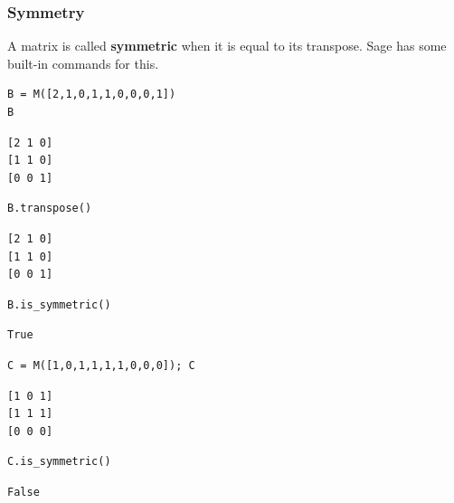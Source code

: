 \documentclass[10pt,]{book}
\newcommand{\terminology}[1]{\textbf{#1}}
\theoremstyle{plain}
\theoremstyle{definition}
\numberwithin{equation}{section}
\begin{document}
\subsubsection[Symmetry]{Symmetry}\label{subsubsection-34}

        A matrix is called \terminology{symmetric} when it is equal to its
        transpose. Sage has some built-in commands for this.
\begin{lstlisting}[style=sageinput]
B = M([2,1,0,1,1,0,0,0,1])
B
\end{lstlisting}
\begin{lstlisting}[style=sageoutput]
[2 1 0]
[1 1 0]
[0 0 1]
\end{lstlisting}
\begin{lstlisting}[style=sageinput]
B.transpose()
\end{lstlisting}
\begin{lstlisting}[style=sageoutput]
[2 1 0]
[1 1 0]
[0 0 1]
\end{lstlisting}
\begin{lstlisting}[style=sageinput]
B.is_symmetric()
\end{lstlisting}
\begin{lstlisting}[style=sageoutput]
True
\end{lstlisting}
\begin{lstlisting}[style=sageinput]
C = M([1,0,1,1,1,1,0,0,0]); C
\end{lstlisting}
\begin{lstlisting}[style=sageoutput]
[1 0 1]
[1 1 1]
[0 0 0]
\end{lstlisting}
\begin{lstlisting}[style=sageinput]
C.is_symmetric()
\end{lstlisting}
\begin{lstlisting}[style=sageoutput]
False
\end{lstlisting}
\par
\end{document}
